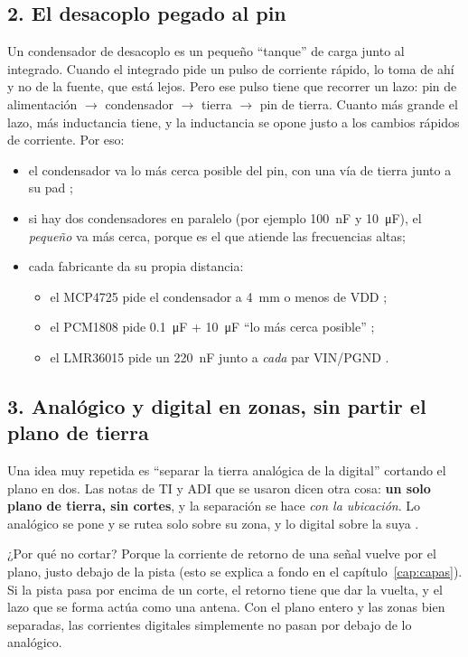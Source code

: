 \subsection{2. El desacoplo pegado al pin}
Un condensador de desacoplo es un pequeño ``tanque'' de carga junto al integrado. Cuando el integrado pide un pulso
de corriente rápido, lo toma de ahí y no de la fuente, que está lejos. Pero ese pulso tiene que recorrer un lazo:
pin de alimentación $\to$ condensador $\to$ tierra $\to$ pin de tierra. Cuanto más grande el lazo, más inductancia
tiene, y la inductancia se opone justo a los cambios rápidos de corriente. Por eso:
\begin{itemize}
  \item el condensador va lo más cerca posible del pin, con una vía de tierra junto a su pad
        ;
  \item si hay dos condensadores en paralelo (por ejemplo \SI{100}{\nano\farad} y \SI{10}{\micro\farad}), el
        \emph{pequeño} va más cerca, porque es el que atiende las frecuencias altas;
  \item cada fabricante da su propia distancia:
  \begin{itemize}
    \item el MCP4725 pide el condensador a \SI{4}{\milli\meter} o menos de VDD ;
    \item el PCM1808 pide \SI{0.1}{\micro\farad} + \SI{10}{\micro\farad} ``lo más cerca posible''
          ;
    \item el LMR36015 pide un \SI{220}{\nano\farad} junto a \emph{cada} par VIN/PGND .
  \end{itemize}
\end{itemize}

\subsection{3. Analógico y digital en zonas, sin partir el plano de tierra}
\begin{idea}
Una idea muy repetida es ``separar la tierra analógica de la digital'' cortando el plano en dos. Las notas de TI y
ADI que se usaron dicen otra cosa: \textbf{un solo plano de tierra, sin cortes}, y la separación se hace
\emph{con la ubicación}. Lo analógico se pone y se rutea solo sobre su zona, y lo digital sobre la suya
.

¿Por qué no cortar? Porque la corriente de retorno de una señal vuelve por el plano, justo debajo de la pista (esto
se explica a fondo en el capítulo~\ref{cap:capas}). Si la pista pasa por encima de un corte, el retorno tiene que dar
la vuelta, y el lazo que se forma actúa como una antena. Con el plano entero y las zonas bien separadas, las
corrientes digitales simplemente no pasan por debajo de lo analógico.
\end{idea}

